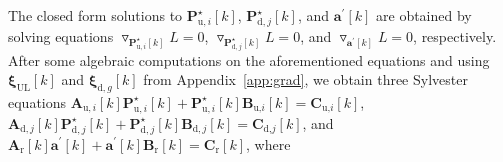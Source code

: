 \documentclass[9pt,journal]{IEEEtran}
\newcommand{\paren}[1]{\left({#1}\right)}
\newcommand{\bracket}[1]{{\left [{#1}\right ]}}
\theoremstyle{definition}
\begin{document}
The closed form solutions to  $\mathbf{P}^\star_{\textrm{u},i}\bracket{k}$, $\mathbf{P}^\star_{\textrm{d},j}\bracket{k}$, and $\mathbf{a}^\prime\bracket{k}$ are obtained by solving equations $\triangledown_{\mathbf{P}^\star_{\textrm{u},i}\bracket{k}}L=0$, $\triangledown_{\mathbf{P}^\star_{\textrm{d},j}\bracket{k}}L=0$, and $\triangledown_{\mathbf{a}^\prime\bracket{k}}L=0$, respectively.
After some algebraic computations on the aforementioned equations and using $\boldsymbol{\xi}_{\textrm{UL}}\bracket{k}$ and  $\boldsymbol{\xi}_{\textrm{d},g}\bracket{k}$ from Appendix~\ref{app:grad}, we obtain three Sylvester equations $\mathbf{A}_{\textrm{u},i}\bracket{k}\mathbf{P}^\star_{\textrm{u},i}\bracket{k}+\mathbf{P}^\star_{\textrm{u},i}\bracket{k}\mathbf{B}_{\textrm{u,}i}\bracket{k}=\mathbf{C}_{\textrm{u,}i}\bracket{k}$, $\mathbf{A}_{\textrm{d},j}\bracket{k}\mathbf{P}^\star_{\textrm{d},j}\bracket{k}+\mathbf{P}^\star_{\textrm{d},j}\bracket{k}\mathbf{B}_{\textrm{d},j}\bracket{k}=\mathbf{C}_{\textrm{d,}j}\bracket{k}$, and $\mathbf{A}_{\textrm{r}}\bracket{k}\mathbf{a}^\prime\bracket{k}+\mathbf{a}^\prime\bracket{k}\mathbf{B}_{\textrm{r}}\bracket{k}=\mathbf{C}_{\textrm{r}}\bracket{k}$, where \par\indent\small
\end{document}
